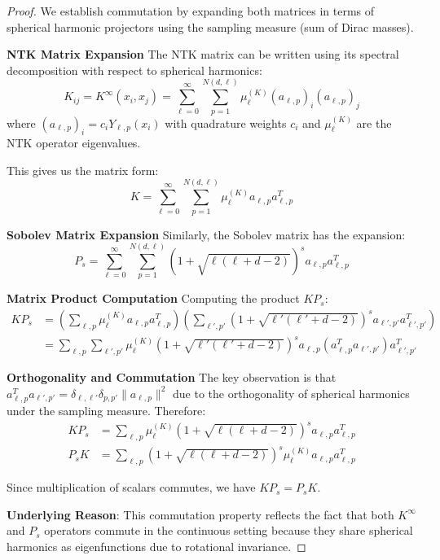 \documentclass[a4paper]{article}
\begin{document}
\begin{proof}
We establish commutation by expanding both matrices in terms of spherical harmonic projectors using the sampling measure (sum of Dirac masses).

\textbf{NTK Matrix Expansion}
The NTK matrix can be written using its spectral decomposition with respect to spherical harmonics:
\[ K_{ij} = K^{\infty}(x_i, x_j) = \sum_{\ell=0}^{\infty} \sum_{p=1}^{N(d,\ell)} \mu_\ell^{(K)} (a_{\ell,p})_i (a_{\ell,p})_j \]
where $(a_{\ell,p})_i = c_i Y_{\ell,p}(x_i)$ with quadrature weights $c_i$ and $\mu_\ell^{(K)}$ are the NTK operator eigenvalues.

This gives us the matrix form:
\[ K = \sum_{\ell=0}^{\infty} \sum_{p=1}^{N(d,\ell)} \mu_\ell^{(K)} a_{\ell,p} a_{\ell,p}^T \]

\textbf{Sobolev Matrix Expansion}
Similarly, the Sobolev matrix has the expansion:
\[ P_s = \sum_{\ell=0}^{\infty} \sum_{p=1}^{N(d,\ell)} (1 + \sqrt{\ell(\ell + d - 2)})^s a_{\ell,p} a_{\ell,p}^T \]

\textbf{Matrix Product Computation}
Computing the product $KP_s$:
\begin{align}
KP_s &= \left(\sum_{\ell,p} \mu_\ell^{(K)} a_{\ell,p} a_{\ell,p}^T\right) \left(\sum_{\ell',p'} (1 + \sqrt{\ell'(\ell' + d - 2)})^s a_{\ell',p'} a_{\ell',p'}^T\right) \\
&= \sum_{\ell,p} \sum_{\ell',p'} \mu_\ell^{(K)} (1 + \sqrt{\ell'(\ell' + d - 2)})^s a_{\ell,p} (a_{\ell,p}^T a_{\ell',p'}) a_{\ell',p'}^T
\end{align}

\textbf{Orthogonality and Commutation}
The key observation is that $a_{\ell,p}^T a_{\ell',p'} = \delta_{\ell,\ell'} \delta_{p,p'} \|a_{\ell,p}\|^2$ due to the orthogonality of spherical harmonics under the sampling measure. Therefore:
\begin{align}
KP_s &= \sum_{\ell,p} \mu_\ell^{(K)} (1 + \sqrt{\ell(\ell + d - 2)})^s a_{\ell,p} a_{\ell,p}^T \\
P_sK &= \sum_{\ell,p} (1 + \sqrt{\ell(\ell + d - 2)})^s \mu_\ell^{(K)} a_{\ell,p} a_{\ell,p}^T
\end{align}

Since multiplication of scalars commutes, we have $KP_s = P_sK$.

\textbf{Underlying Reason}: This commutation property reflects the fact that both $K^{\infty}$ and $P_s$ operators commute in the continuous setting because they share spherical harmonics as eigenfunctions due to rotational invariance.
\end{proof}
\end{document}
